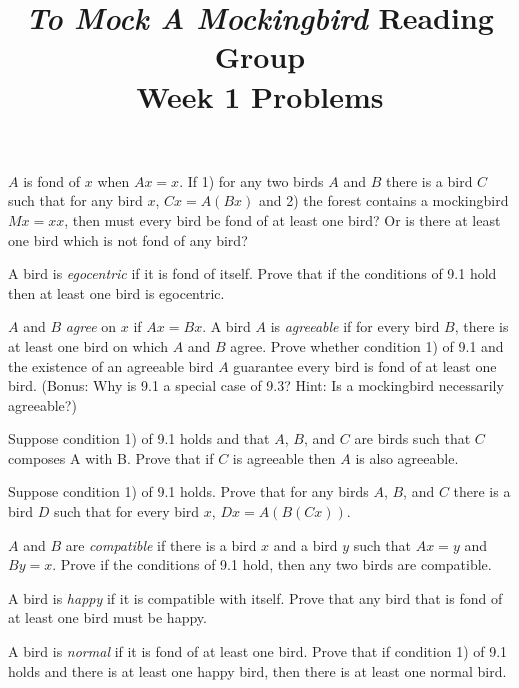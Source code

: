 \documentclass[12pt, letterpaper]{article}
\title{\emph{To Mock A Mockingbird} Reading Group\\Week 1 Problems}
\begin{document}
\maketitle

\disclaimer

\begin{prob}{9.1}
$A$ is fond of $x$ when $Ax = x$. If 1) for any two birds $A$ and $B$ there is a bird $C$ such that for any bird $x$, $Cx = A(Bx)$ and 2) the forest contains a mockingbird $Mx = xx$, then must every bird be fond of at least one bird? Or is there at least one bird which is not fond of any bird?
\end{prob}

\begin{prob}{9.2}
A bird is \emph{egocentric} if it is fond of itself. Prove that if the conditions of 9.1 hold then at least one bird is egocentric.
\end{prob}

\begin{prob}{9.3}
$A$ and $B$ \emph{agree} on $x$ if $Ax = Bx$. A bird $A$ is \emph{agreeable} if for every bird $B$, there is at least one bird on which $A$ and $B$ agree. Prove whether condition 1) of 9.1 and the existence of an agreeable bird $A$ guarantee every bird is fond of at least one bird. (Bonus: Why is 9.1 a special case of 9.3? Hint: Is a mockingbird necessarily agreeable?)
\end{prob}

\begin{prob}{9.4}
Suppose condition 1) of 9.1 holds and that $A$, $B$, and $C$ are birds such that $C$ composes A with B. Prove that if $C$ is agreeable then $A$ is also agreeable.
\end{prob}

\begin{prob}{9.5}
Suppose condition 1) of 9.1 holds. Prove that for any birds $A$, $B$, and $C$ there is a bird $D$ such that for every bird $x$, $Dx = A(B(Cx))$.
\end{prob}

\begin{prob}{9.6}
$A$ and $B$ are \emph{compatible} if there is a bird $x$ and a bird $y$ such that $Ax = y$ and $By = x$. Prove if the conditions of 9.1 hold, then any two birds are compatible.
\end{prob}

\begin{prob}{9.7}
A bird is \emph{happy} if it is compatible with itself. Prove that any bird that is fond of at least one bird must be happy.
\end{prob}

\begin{prob}{9.8}
A bird is \emph{normal} if it is fond of at least one bird. Prove that if condition 1) of 9.1 holds and there is at least one happy bird, then there is at least one normal bird.
\end{prob}
\end{document}
